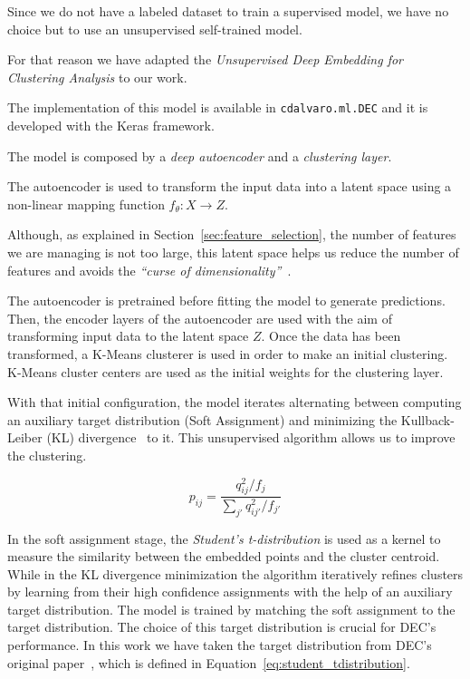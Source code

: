 \documentclass[11pt, a4paper, english]{book}
\begin{document}
Since we do not have a labeled dataset to train a supervised model,
we have no choice but to use an unsupervised self-trained model.

For that reason we have adapted the \emph{Unsupervised Deep Embedding for Clustering Analysis} to our work.

The implementation of this model is available in \verb|cdalvaro.ml.DEC|
and it is developed with the Keras framework.

The model is composed by a \emph{deep autoencoder} and a \emph{clustering layer}.

The autoencoder is used to transform the input data into a latent space
using a non-linear mapping function \(f_{\theta} : X \rightarrow Z\).

Although, as explained in Section~\ref{sec:feature_selection},
the number of features we are managing is not too large,
this latent space helps us reduce the number of features
and avoids the \emph{``curse of dimensionality''}~\cite{bellman1961curse}.

The autoencoder is pretrained before fitting the model to generate predictions. Then,
the encoder layers of the autoencoder are used with the aim of transforming input data to
the latent space \(Z\). Once the data has been transformed, a K-Means clusterer is used in
order to make an initial clustering. K-Means cluster centers are used as the initial
weights for the clustering layer.

With that initial configuration,
the model iterates alternating between computing an auxiliary target distribution (Soft Assignment)
and minimizing the Kullback-Leiber (KL) divergence~\cite{kullback1951information} to it.
This unsupervised algorithm allows us to improve the clustering.

\begin{equation}
  p_{ij} = \frac{q^{2}_{ij} / f_{j}}{\sum_{j'}q^{2}_{ij'}/f_{j'}}
  \label{eq:student_tdistribution}
\end{equation}

In the soft assignment stage,
the \emph{Student's t-distribution} is used as a kernel to measure the similarity
between the embedded points and the cluster centroid.
While in the KL divergence minimization the algorithm iteratively refines clusters by learning
from their high confidence assignments with the help of an auxiliary target distribution.
The model is trained by matching the soft assignment to the target distribution.
The choice of this target distribution is crucial for DEC's performance.
In this work we have taken the target distribution from DEC's original paper~\cite{xie2016unsupervised},
which is defined in Equation~\ref{eq:student_tdistribution}.
\end{document}

